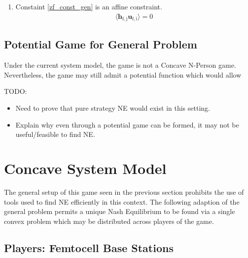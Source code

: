 \documentclass[12pt,a4paper]{report}
\begin{document}
\begin{enumerate}
\item 
	Constaint \eqref{zf_const_gen} is an affine constraint. 
		\begin{gather*}
		\langle \mathbf{h_{\mathrm{f,j}}}\mathbf{u_{\mathrm{f,i}}} \rangle =0
		\end{gather*}

\end{enumerate}

\subsection{Potential Game for General Problem}
Under the current system model, the game is not a Concave N-Person game. Nevertheless, the game may still admit a potential function which would allow 

TODO: 
\begin{itemize}
\item Need to prove that pure strategy NE would exist in this setting.
\item Explain why even through a potential game can be formed, it may not be useful/feasible to find NE. 
\end{itemize}

\section{Concave System Model}\label{conmodel}

The general setup of this game  seen in the previous section prohibits the use of tools used to find NE efficiently in this context. 
The following adaption of the general problem permits a unique Nash Equilibrium to be found via a single convex problem which may be distributed across players of the game.
\subsection{Players: Femtocell Base Stations}
\end{document}

